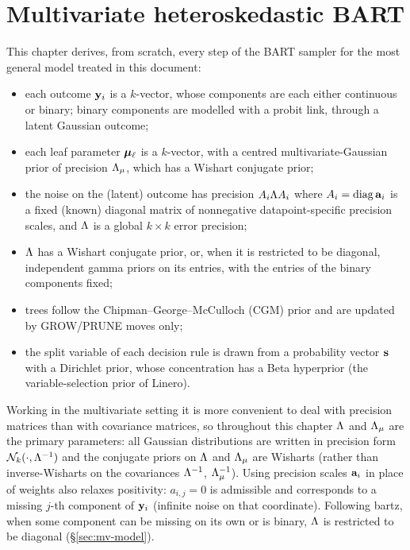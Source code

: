 \chapter{Multivariate heteroskedastic BART}
\label{ch:full}

This chapter derives, from scratch, every step of the BART sampler for the
most general model treated in this document:
\begin{itemize}
	\item each outcome $\mathbf{y}_i$ is a $k$-vector, whose components are each
	      either continuous or binary; binary components are modelled with a
	      probit link, through a latent Gaussian outcome;
	\item each leaf parameter $\bm{\mu}_\ell$ is a $k$-vector, with a centred
	      multivariate-Gaussian prior of precision $\Lambda_{\mu}$, which has a
	      Wishart conjugate prior;
	\item the noise on the (latent) outcome has precision $A_i \Lambda A_i$
	      where $A_i = \operatorname{diag}\mathbf{a}_i$ is a fixed (known) diagonal matrix of
	      nonnegative datapoint-specific precision scales, and $\Lambda$ is a
	      global $k \times k$ error precision;
	\item $\Lambda$ has a Wishart conjugate prior, or, when it is restricted to
	      be diagonal, independent gamma priors on its entries, with the
	      entries of the binary components fixed;
	\item trees follow the Chipman--George--McCulloch (CGM) prior and are
	      updated by GROW/PRUNE moves only;
	\item the split variable of each decision rule is drawn from a
	      probability vector $\mathbf{s}$ with a Dirichlet prior, whose concentration
	      has a Beta hyperprior (the variable-selection prior of Linero).
\end{itemize}
Working in the multivariate setting it is more convenient to deal with
precision matrices than with covariance matrices, so throughout this chapter
$\Lambda$ and $\Lambda_{\mu}$ are the primary parameters: all Gaussian distributions
are written in precision form $\mathcal{N}_k(\cdot, \Lambda^{-1})$ and the conjugate
priors on $\Lambda$ and $\Lambda_{\mu}$ are Wisharts (rather than inverse-Wisharts on
the covariances $\Lambda^{-1}$, $\Lambda_{\mu}^{-1}$). Using precision scales $\mathbf{a}_i$ in place of weights
also relaxes positivity: $a_{i,j} = 0$ is admissible and corresponds to a
missing $j$-th component of $\mathbf{y}_i$ (infinite noise on that coordinate).
Following bartz, when some component can be missing on its own or is binary,
$\Lambda$ is restricted to be diagonal (\S\ref{sec:mv-model}).

